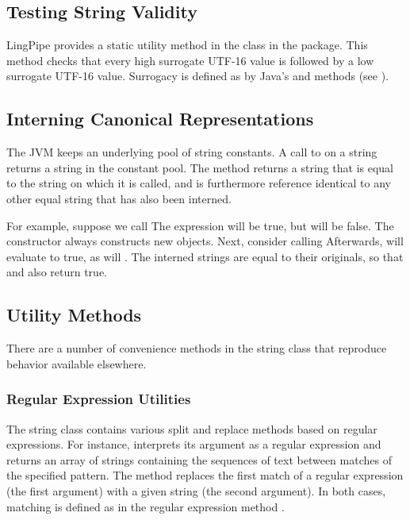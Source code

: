 \subsection{Testing String Validity}

LingPipe provides a static utility method
 in the  class in
the  package.  This method checks that every
high surrogate UTF-16  value is followed by a low surrogate
UTF-16 value.  Surrogacy is defined as by Java's
 and
 methods (see ).


\subsection{Interning Canonical Representations}\label{section:string-intern}

The JVM keeps an underlying pool of string constants.  A call to
 on a string returns a string in the constant pool.
The method  returns a string that is equal to the
string on which it is called, and is furthermore reference identical
to any other equal string that has also been interned.

For example,  suppose we call
%
%
The expression  will be true, but
 will be false.  The constructor  always
constructs new objects.  Next, consider calling
%
%
Afterwards,  will evaluate to true, as will
.  The interned strings are equal to their
originals, so that  and  also
return true.


\subsection{Utility Methods}

There are a number of convenience methods in the string class that
reproduce behavior available elsewhere.  

\subsubsection{Regular Expression Utilities}

The string class contains various split and replace methods based on
regular expressions.  For instance,  interprets
its argument as a regular expression and returns an array of strings
containing the sequences of text between matches of the specified
pattern.  The method  replaces the
first match of a regular expression (the first argument) with a given
string (the second argument).  In both cases, matching is defined as
in the regular expression method .


